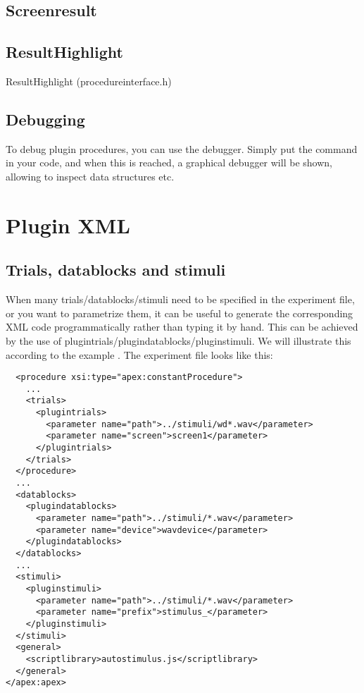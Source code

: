 

\subsection{Screenresult}
\label{sec:screenresult}




\subsection{ResultHighlight}
\label{sec:resulthighlight}

ResultHighlight (procedureinterface.h)



\subsection{Debugging}

To debug plugin procedures, you can use the debugger. Simply put the command  in your code, and when this is reached, a graphical debugger will be shown, allowing to inspect data structures etc.


\section{Plugin XML}
\label{sec:pluginxml}

\subsection{Trials, datablocks and stimuli}


When many trials/datablocks/stimuli need to be specified in the experiment file, or you want to parametrize them, it can be useful to generate the corresponding XML code programmatically rather than typing it by hand. This can be achieved by the use of plugintrials/plugindatablocks/pluginstimuli. We will illustrate this according to the example . The experiment file looks like this:

\begin{lstlisting}
  <procedure xsi:type="apex:constantProcedure">
	...
    <trials>
      <plugintrials>
        <parameter name="path">../stimuli/wd*.wav</parameter>
        <parameter name="screen">screen1</parameter>
      </plugintrials>
    </trials>
  </procedure>
  ...
  <datablocks>
    <plugindatablocks>
      <parameter name="path">../stimuli/*.wav</parameter>
      <parameter name="device">wavdevice</parameter>
    </plugindatablocks>
  </datablocks>
  ...
  <stimuli>
    <pluginstimuli>
      <parameter name="path">../stimuli/*.wav</parameter>
      <parameter name="prefix">stimulus_</parameter>
    </pluginstimuli>
  </stimuli>
  <general>
    <scriptlibrary>autostimulus.js</scriptlibrary>
  </general>
</apex:apex>
\end{lstlisting}

